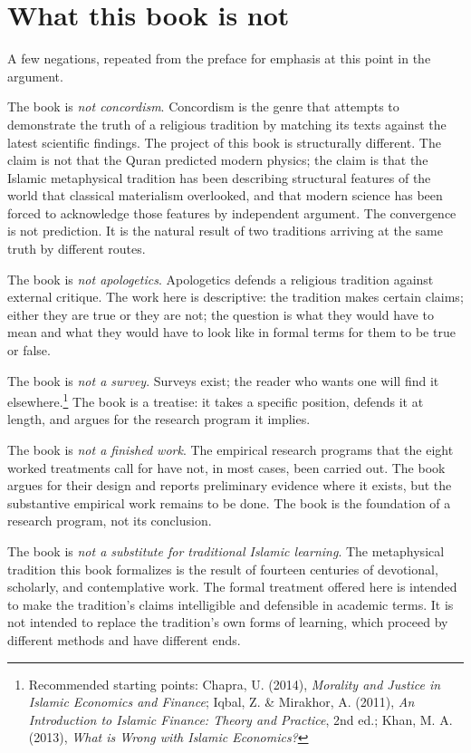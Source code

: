 \section{What this book is not}
\label{sec:not}

A few negations, repeated from the preface for emphasis at this
point in the argument.

The book is \emph{not concordism}. Concordism is the genre that
attempts to demonstrate the truth of a religious tradition by
matching its texts against the latest scientific findings. The
project of this book is structurally different. The claim is not
that the Quran predicted modern physics; the claim is that the
Islamic metaphysical tradition has been describing structural
features of the world that classical materialism overlooked, and
that modern science has been forced to acknowledge those features
by independent argument. The convergence is not prediction. It is
the natural result of two traditions arriving at the same truth by
different routes.

The book is \emph{not apologetics}. Apologetics defends a religious
tradition against external critique. The work here is descriptive:
the tradition makes certain claims; either they are true or they
are not; the question is what they would have to mean and what they
would have to look like in formal terms for them to be true or
false.

The book is \emph{not a survey}. Surveys exist; the reader who wants
one will find it elsewhere.\footnote{Recommended starting points:
Chapra, U. (2014), \emph{Morality and Justice in Islamic Economics
and Finance}; Iqbal, Z. \& Mirakhor, A. (2011), \emph{An Introduction
to Islamic Finance: Theory and Practice}, 2nd ed.; Khan, M. A.
(2013), \emph{What is Wrong with Islamic Economics?}} The book is a
treatise: it takes a specific position, defends it at length, and
argues for the research program it implies.

The book is \emph{not a finished work}. The empirical research
programs that the eight worked treatments call for have not, in
most cases, been carried out. The book argues for their design and
reports preliminary evidence where it exists, but the substantive
empirical work remains to be done. The book is the foundation of a
research program, not its conclusion.

The book is \emph{not a substitute for traditional Islamic
learning}. The metaphysical tradition this book formalizes is the
result of fourteen centuries of devotional, scholarly, and
contemplative work. The formal treatment offered here is intended
to make the tradition's claims intelligible and defensible in
academic terms. It is not intended to replace the tradition's own
forms of learning, which proceed by different methods and have
different ends.

